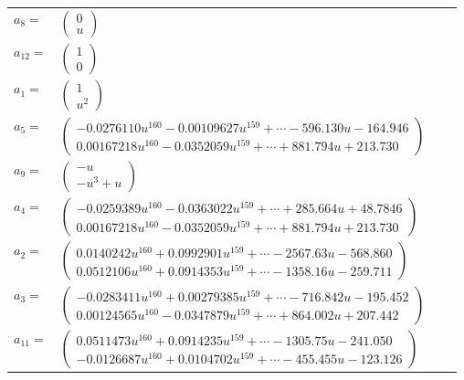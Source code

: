 \documentclass[1p]{elsarticle_modified}
\theoremstyle{definition}
\begin{document}
\begin{tabular}{m{7pt} m{180pt} m{7pt} m{180pt} }
\flushright $a_{8}=$&$\begin{pmatrix}0\\u\end{pmatrix}$ \\
\flushright $a_{12}=$&$\begin{pmatrix}1\\0\end{pmatrix}$ \\
\flushright $a_{1}=$&$\begin{pmatrix}1\\u^2\end{pmatrix}$ \\
\flushright $a_{5}=$&$\begin{pmatrix}-0.0276110 u^{160}-0.00109627 u^{159}+\cdots-596.130 u-164.946\\0.00167218 u^{160}-0.0352059 u^{159}+\cdots+881.794 u+213.730\end{pmatrix}$ \\
\flushright $a_{9}=$&$\begin{pmatrix}- u\\- u^3+u\end{pmatrix}$ \\
\flushright $a_{4}=$&$\begin{pmatrix}-0.0259389 u^{160}-0.0363022 u^{159}+\cdots+285.664 u+48.7846\\0.00167218 u^{160}-0.0352059 u^{159}+\cdots+881.794 u+213.730\end{pmatrix}$ \\
\flushright $a_{2}=$&$\begin{pmatrix}0.0140242 u^{160}+0.0992901 u^{159}+\cdots-2567.63 u-568.860\\0.0512106 u^{160}+0.0914353 u^{159}+\cdots-1358.16 u-259.711\end{pmatrix}$ \\
\flushright $a_{3}=$&$\begin{pmatrix}-0.0283411 u^{160}+0.00279385 u^{159}+\cdots-716.842 u-195.452\\0.00124565 u^{160}-0.0347879 u^{159}+\cdots+864.002 u+207.442\end{pmatrix}$ \\
\flushright $a_{11}=$&$\begin{pmatrix}0.0511473 u^{160}+0.0914235 u^{159}+\cdots-1305.75 u-241.050\\-0.0126687 u^{160}+0.0104702 u^{159}+\cdots-455.455 u-123.126\end{pmatrix}$ \\

\end{tabular}
\end{document}
